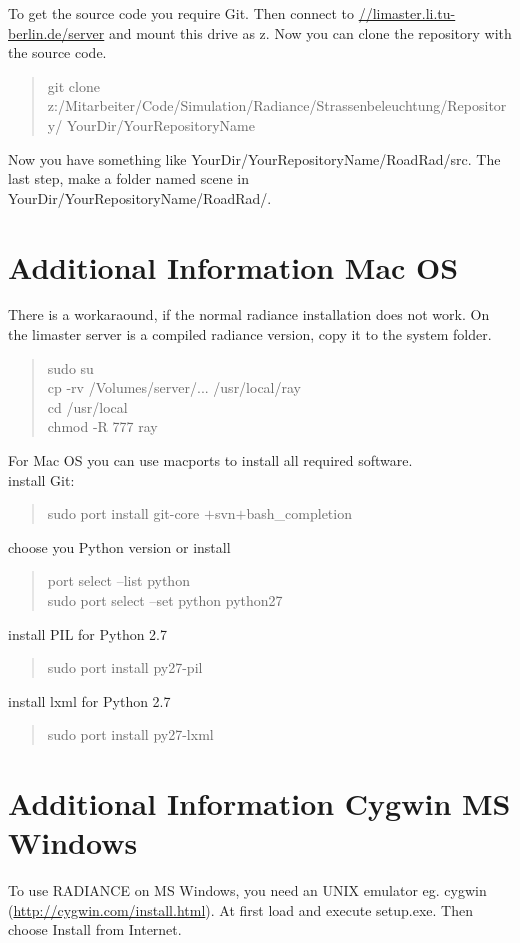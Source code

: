 \documentclass[10pt,a4paper]{report}
\begin{document}
To get the source code you require Git. Then connect to \url{//limaster.li.tu-berlin.de/server} and
mount this drive as \glqq z\grqq. Now you can clone the repository with the source code.

\begin{quote}
git clone \\
z:/Mitarbeiter/Code/Simulation/Radiance/Strassenbeleuchtung/Repository/ YourDir/YourRepositoryName
\end{quote}

Now you have something like \glqq YourDir/YourRepositoryName/RoadRad/src\grqq. The last step, make a folder named scene in \glqq YourDir/YourRepositoryName/RoadRad/\grqq.

\section{Additional Information Mac OS}
There is a workaraound, if the normal radiance installation does not work. On the limaster server is a compiled radiance version, copy it to the system folder.

\begin{quote}
sudo su\\
cp -rv /Volumes/server/... /usr/local/ray\\
cd /usr/local\\
chmod -R 777 ray
\end{quote}

For Mac OS you can use macports to install all required software.\\
install Git:
\begin{quote}
sudo port install git-core $+$svn$+$bash\_completion
\end{quote}
choose you Python version or install
\begin{quote}
port select --list python\\
sudo port select --set python python27
\end{quote}
install PIL for Python 2.7
\begin{quote}
sudo port install py27-pil
\end{quote}
install lxml for Python 2.7
\begin{quote}
sudo port install py27-lxml
\end{quote}

\section{Additional Information Cygwin MS Windows}
To use RADIANCE on MS Windows, you need an UNIX emulator eg. cygwin (\url{http://cygwin.com/install.html}). At first load and execute setup.exe. Then choose Install from Internet.
\end{document}
